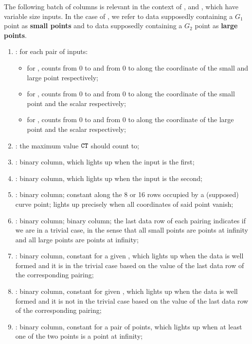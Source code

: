 The following batch of columns is relevant in the context of ,  and , which have variable size inputs.
In the case of , we refer to data supposedly containing a $G_1$ point as \textbf{small points} and to data supposedly containing a $G_2$ point as \textbf{large points}.
\begin{enumerate}[resume]
      \item \ct:
            for each pair of inputs:
            \begin{itemize}
                  \item for , counts from 0 to \ctMaxSmallPoint{} and from 0 to \ctMaxLargePoint{} along the coordinate of the small and large point respectively;
                  \item for , counts from 0 to \ctMaxSmallPoint{} and from 0 to \ctMaxScalar{} along the coordinate of the small point and the scalar respectively;
                  \item for , counts from 0 to \ctMaxLargePoint{} and from 0 to \ctMaxScalar{} along the coordinate of the large point and the scalar respectively;
            \end{itemize}
      \item \maxCt:
            the maximum value $\texttt{CT}$ should count to;
      \item \isFirstInput:
            binary column, which lights up when the input is the first;
      \item \isSecondInput:
            binary column, which lights up when the input is the second;
      \item \isInfinity:
            binary column;
            constant along the 8 or 16 rows occupied by a (supposed) curve point;
            lights up precisely when all coordinates of said point vanish;

      \item \trivialAcc: binary column; binary column; the last data row of each pairing indicates if we are in a trivial case, in the sense that all small points are points at infinity and all large points are points at infinity;
      \item \both{\wellformedDataTrivial}: binary column, constant for a given \blsId, which lights up when the data is well formed and it is in the trivial case based on the value of the last data row of the corresponding pairing;
      \item \both{\wellformedDataNonTrivial}: binary column, constant for  given \blsId, which lights up when the data is well formed and it is not in the trivial case based on the value of the last data row of the corresponding pairing;
      \item \both{\pairOfPointsContainsInfinity}: binary column, constant for a pair of points, which lights up when at least one of the two points is a point at infinity;
      


\end{enumerate}
